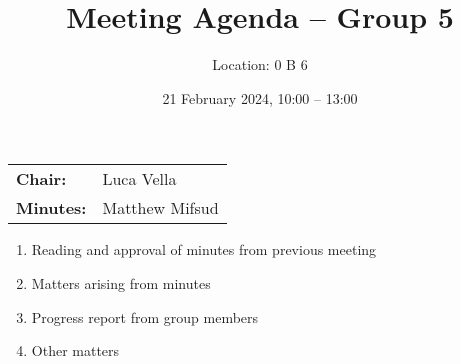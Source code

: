 \documentclass{cce2014-meetings}
\title{Meeting Agenda -- Group 5}
\author{Location: 0 B 6}
\date{21 February 2024, 10:00 -- 13:00}
\begin{document}
\maketitle
\begin{center}
\begin{tabular}{ll}
\textbf{Chair:}   & Luca Vella \\
\textbf{Minutes:} & Matthew Mifsud
\end{tabular}
\end{center}

\begin{enumerate}

\item Reading and approval of minutes from previous meeting

\item Matters arising from minutes

\item Progress report from group members


\item Other matters

\end{enumerate}
\end{document}
